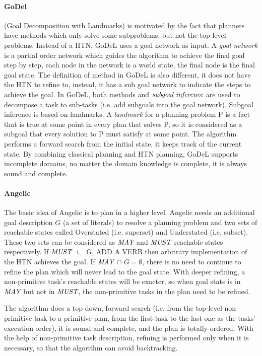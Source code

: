\paragraph*{GoDel}
\cite{godel} (Goal Decomposition with Landmarks) is motivated by the fact that planners have methods which only solve some subproblems, but not the top-level problems. Instead of a HTN, GoDeL uses a goal network as input. A {\em goal network} is a partial order network which guides the algorithm to achieve the final goal step by step, each node in the network is a world state, the final node is the final goal state. The definition of method in GoDeL is also different, it does not have the HTN to refine to, instead, it has a sub goal network to indicate the steps to achieve the goal. In GoDeL, both methods and $\emph{subgoal inference}$ are used to decompose a task to sub-tasks (i.e. add subgoals into the goal network). Subgoal inference is based on landmarks. A {\em landmark} for a planning problem P is a fact that is true at some point in every plan that solves P, so it is considered as a subgoal that every solution to P must satisfy at some point. The algorithm performs a forward search from the initial state, it keeps track of the current state. By combining classical planning and HTN planning, GoDeL supports incomplete domains, no matter the domain knowledge is complete, it is always sound and complete. 


\paragraph*{Angelic}
The basic idea of Angelic \cite{angelic1} is to plan in a higher level. Angelic needs an additional goal description $G$ (a set of literals) to resolve a planning problem and two sets of reachable states called Overstated (i.e. superset) and Understated (i.e. subset). These two sets can be considered as $\emph{MAY}$ and $\emph{MUST}$ reachable states respectively. If $\emph{MUST}$ $\subseteq$ G, ADD A VERB then arbitrary implementation of the HTN achieves the goal. If $\emph{MAY}$ $\cap$ $G = \emptyset$, there is no need to continue to refine the plan which will never lead to the goal state. With deeper refining, a non-primitive task’s reachable states will be exacter, so when goal state is in $\emph{MAY}$ but not in $\emph{MUST}$, the non-primitive tasks in the plan need to be refined. 

The algorithm does a top-down, forward search (i.e. from the top-level non-primitive task to a primitive plan, from the first task to the last one as the tasks’ execution order), it is sound and complete, and the plan is totally-ordered. With the help of non-primitive task description, refining is performed only when it is necessary, so that the algorithm can avoid backtracking.

